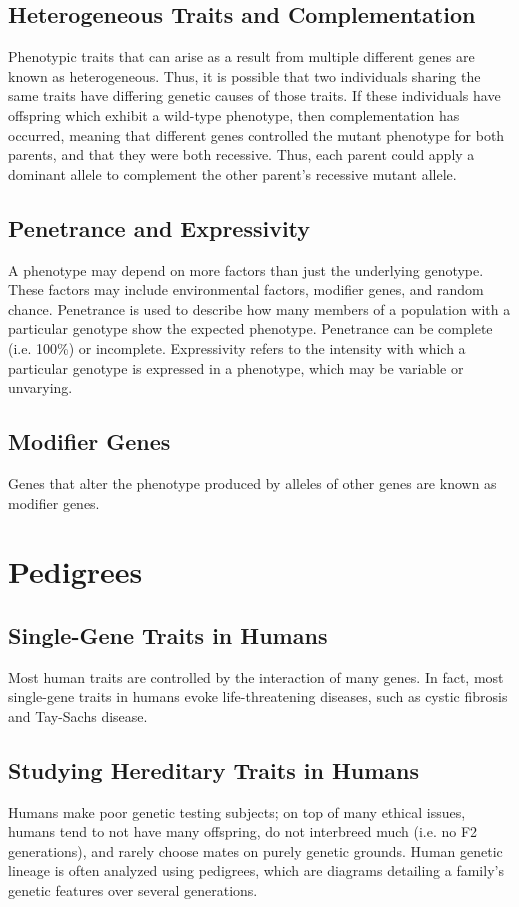 \documentclass[12pt,titlepage]{article}
\begin{document}
      \subsection{Heterogeneous Traits and Complementation}
        Phenotypic traits that can arise as a result from multiple different genes are known as heterogeneous. Thus, it is possible that two individuals
        sharing the same traits have differing genetic causes of those traits. If these individuals have offspring which exhibit a wild-type phenotype, then
        complementation has occurred, meaning that different genes controlled the mutant phenotype for both parents, and that they were both recessive. Thus,
        each parent could apply a dominant allele to complement the other parent's recessive mutant allele.

      \subsection{Penetrance and Expressivity}
        A phenotype may depend on more factors than just the underlying genotype. These factors may include environmental factors, modifier genes, and random
        chance. Penetrance is used to describe how many members of a population with a particular genotype show the expected phenotype. Penetrance can be complete
        (i.e. 100\%) or incomplete. Expressivity refers to the intensity with which a particular genotype is expressed in a phenotype, which may be variable or
        unvarying.

      \subsection{Modifier Genes}
        Genes that alter the phenotype produced by alleles of other genes are known as modifier genes.

    \section{Pedigrees}
      \subsection{Single-Gene Traits in Humans}
        Most human traits are controlled by the interaction of many genes. In fact, most single-gene traits in humans evoke life-threatening diseases, such as
        cystic fibrosis and Tay-Sachs disease.

      \subsection{Studying Hereditary Traits in Humans}
        Humans make poor genetic testing subjects; on top of many ethical issues, humans tend to not have many offspring, do not interbreed much
        (i.e. no F2 generations), and rarely choose mates on purely genetic grounds. Human genetic lineage is often analyzed using pedigrees, which
        are diagrams detailing a family's genetic features over several generations.
\end{document}
